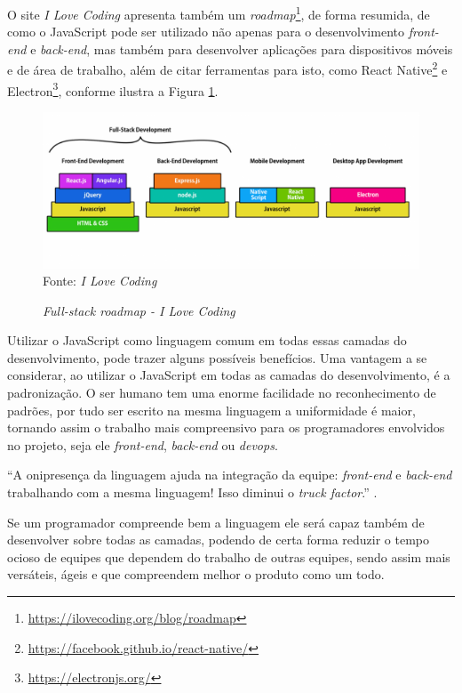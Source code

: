 \documentclass[
	12pt,				%
	openright,			%
	twoside,			%
	a4paper,			%
	english,			%
	brazil				%
	]{abntex2}
\begin{document}
O site \textit{I Love Coding} apresenta também um \textit{roadmap}\footnote{\url{https://ilovecoding.org/blog/roadmap}}, de forma resumida, de como o JavaScript pode ser utilizado não apenas para o desenvolvimento \textit{front-end} e \textit{back-end}, mas também para desenvolver aplicações para dispositivos móveis e de área de trabalho, além de citar ferramentas para isto, como React Native\footnote{\url{https://facebook.github.io/react-native/}} e Electron\footnote{\url{https://electronjs.org/}}, conforme ilustra a Figura \ref{fig:IlovecodingRoadmap}.

\begin{figure}[h!]
	\centering

	\caption{\textit{Full-stack roadmap - I Love Coding}} \label{fig:IlovecodingRoadmap}
    \includegraphics[scale=0.4]{ilovecoding-roadmap} \\
    Fonte: {\textit{I Love Coding}}

\end{figure}

Utilizar o JavaScript como linguagem comum em todas essas camadas do desenvolvimento, pode trazer alguns possíveis benefícios. Uma vantagem a se considerar, ao utilizar o JavaScript em todas as camadas do desenvolvimento, é a padronização. O ser humano tem uma enorme facilidade no reconhecimento de padrões, por tudo ser escrito na mesma linguagem a uniformidade é maior, tornando assim o trabalho mais compreensivo para os programadores envolvidos no projeto, seja ele \textit{front-end}, \textit{back-end} ou \textit{devops}. 

{\begin{adjustwidth}{4cm}{0cm}
    “A onipresença da linguagem ajuda na integração da equipe: \textit{front-end} e \textit{back-end} trabalhando com a mesma linguagem! Isso diminui o \textit{truck factor}.” \cite{flavioalmeida_meanstack}.
\end{adjustwidth}}

Se um programador compreende bem a linguagem ele será capaz também de desenvolver sobre todas as camadas, podendo de certa forma reduzir o tempo ocioso de equipes que dependem do trabalho de outras equipes, sendo assim mais versáteis, ágeis e que compreendem melhor o produto como um todo.
\end{document}
